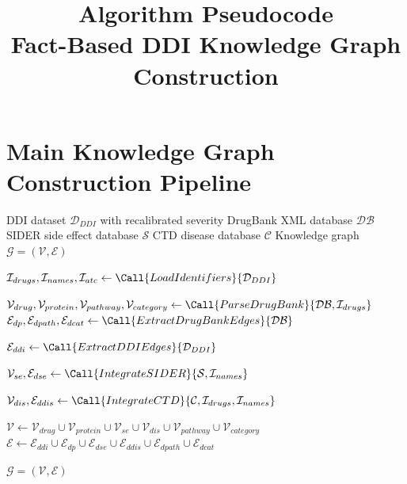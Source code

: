 \documentclass[11pt,a4paper]{article}
\title{\textbf{Algorithm Pseudocode}\\
\large Fact-Based DDI Knowledge Graph Construction}
\author{}
\date{}
\begin{document}
\maketitle

\section{Main Knowledge Graph Construction Pipeline}

\begin{algorithm}[H]
\caption{Fact-Based Knowledge Graph Construction}
\label{alg:main}
\begin{algorithmic}[1]
\REQUIRE DDI dataset $\mathcal{D}_{DDI}$ with recalibrated severity
\REQUIRE DrugBank XML database $\mathcal{DB}$
\REQUIRE SIDER side effect database $\mathcal{S}$
\REQUIRE CTD disease database $\mathcal{C}$
\ENSURE Knowledge graph $\mathcal{G} = (\mathcal{V}, \mathcal{E})$

\STATE {}
\STATE $\mathcal{I}_{drugs}, \mathcal{I}_{names}, \mathcal{I}_{atc} \gets \Call{LoadIdentifiers}{\mathcal{D}_{DDI}}$

\STATE {}
\STATE $\mathcal{V}_{drug}, \mathcal{V}_{protein}, \mathcal{V}_{pathway}, \mathcal{V}_{category} \gets \Call{ParseDrugBank}{\mathcal{DB}, \mathcal{I}_{drugs}}$
\STATE $\mathcal{E}_{dp}, \mathcal{E}_{dpath}, \mathcal{E}_{dcat} \gets \Call{ExtractDrugBankEdges}{\mathcal{DB}}$

\STATE {}
\STATE $\mathcal{E}_{ddi} \gets \Call{ExtractDDIEdges}{\mathcal{D}_{DDI}}$

\STATE {}
\STATE $\mathcal{V}_{se}, \mathcal{E}_{dse} \gets \Call{IntegrateSIDER}{\mathcal{S}, \mathcal{I}_{names}}$

\STATE {}
\STATE $\mathcal{V}_{dis}, \mathcal{E}_{ddis} \gets \Call{IntegrateCTD}{\mathcal{C}, \mathcal{I}_{drugs}, \mathcal{I}_{names}}$

\STATE {}
\STATE $\mathcal{V} \gets \mathcal{V}_{drug} \cup \mathcal{V}_{protein} \cup \mathcal{V}_{se} \cup \mathcal{V}_{dis} \cup \mathcal{V}_{pathway} \cup \mathcal{V}_{category}$
\STATE $\mathcal{E} \gets \mathcal{E}_{ddi} \cup \mathcal{E}_{dp} \cup \mathcal{E}_{dse} \cup \mathcal{E}_{ddis} \cup \mathcal{E}_{dpath} \cup \mathcal{E}_{dcat}$

\RETURN $\mathcal{G} = (\mathcal{V}, \mathcal{E})$
\end{algorithmic}
\end{algorithm}
\end{document}
